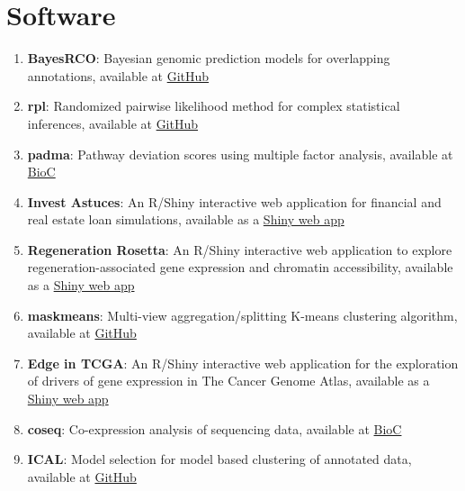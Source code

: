 \documentclass[11pt, a4paper]{awesome-cv}
\providecommand{\tightlist}{%
	\setlength{\itemsep}{0pt}\setlength{\parskip}{0pt}}
\begin{document}
\hypertarget{software}{%
\section{Software}\label{software}}

\begin{enumerate}
\def\labelenumi{\arabic{enumi}.}
\tightlist
\item
  \textbf{BayesRCO}: Bayesian genomic prediction models for overlapping
  annotations, available at
  \href{https://github.com/fmollandin/BayesRCO}{GitHub}\\
\item
  \textbf{rpl}: Randomized pairwise likelihood method for complex
  statistical inferences, available at
  \href{https://github.com/andreamrau/rpl}{GitHub}\\
\item
  \textbf{padma}: Pathway deviation scores using multiple factor
  analysis, available at
  \href{https://bioconductor.org/packages/padma/}{BioC}\\
\item
  \textbf{Invest Astuces}: An R/Shiny interactive web application for
  financial and real estate loan simulations, available as a
  \href{https://investastuces.com/simulateurs/}{Shiny web app}\\
\item
  \textbf{Regeneration Rosetta}: An R/Shiny interactive web application
  to explore regeneration-associated gene expression and chromatin
  accessibility, available as a
  \href{http://ls-shiny-prod.uwm.edu/rosetta/}{Shiny web app}\\
\item
  \textbf{maskmeans}: Multi-view aggregation/splitting K-means
  clustering algorithm, available at
  \href{https://github.com/andreamrau/maskmeans}{GitHub}\\
\item
  \textbf{Edge in TCGA}: An R/Shiny interactive web application for the
  exploration of drivers of gene expression in The Cancer Genome Atlas,
  available as a \href{http://ls-shiny-prod.uwm.edu/edge_in_tcga/}{Shiny
  web app}\\
\item
  \textbf{coseq}: Co-expression analysis of sequencing data, available
  at \href{https://bioconductor.org/packages/coseq/}{BioC}\\
\item
  \textbf{ICAL}: Model selection for model based clustering of annotated
  data, available at \href{https://github.com/Gallopin/ICAL}{GitHub}\\

\end{enumerate}
\end{document}
